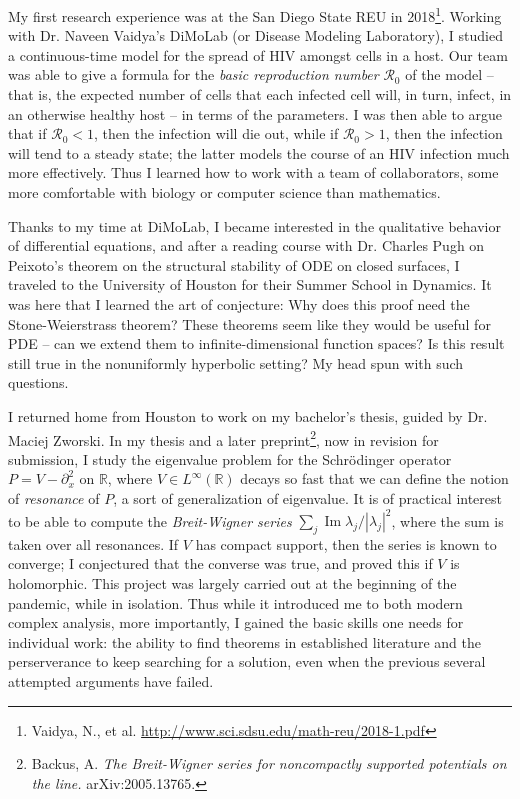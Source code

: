 \documentclass[12pt]{article}
\begin{document}
My first research experience was at the San Diego State REU in 2018\footnote{Vaidya, N., et al. \url{http://www.sci.sdsu.edu/math-reu/2018-1.pdf}}.
Working with Dr. Naveen Vaidya's DiMoLab (or Disease Modeling Laboratory), I studied a continuous-time model for the spread of HIV amongst cells in a host.
Our team was able to give a formula for the \emph{basic reproduction number} $\mathcal R_0$ of the model -- that is, the expected number of cells that each infected cell will, in turn, infect, in an otherwise healthy host -- in terms of the parameters.
I was then able to argue that if $\mathcal R_0 < 1$, then the infection will die out, while if $\mathcal R_0 > 1$, then the infection will tend to a steady state; the latter models the course of an HIV infection much more effectively.
Thus I learned how to work with a team of collaborators, some more comfortable with biology or computer science than mathematics.

Thanks to my time at DiMoLab, I became interested in the qualitative behavior of differential equations, and after a reading course with Dr. Charles Pugh on Peixoto's theorem on the structural stability of ODE on closed surfaces, I traveled to the University of Houston for their Summer School in Dynamics.
It was here that I learned the art of conjecture:
Why does this proof need the Stone-Weierstrass theorem?
These theorems seem like they would be useful for PDE -- can we extend them to infinite-dimensional function spaces?
Is this result still true in the nonuniformly hyperbolic setting?
My head spun with such questions.

I returned home from Houston to work on my bachelor's thesis, guided by Dr. Maciej Zworski.
In my thesis and a later preprint\footnote{Backus, A. \emph{The Breit-Wigner series for noncompactly supported potentials on the line.} arXiv:2005.13765.}, now in revision for submission, I study the eigenvalue problem for the Schr\"odinger operator $P = V - \partial_x^2$ on $\mathbb R$, where $V \in L^\infty(\mathbb R)$ decays so fast that we can define the notion of \emph{resonance} of $P$, a sort of generalization of eigenvalue.
It is of practical interest to be able to compute the \emph{Breit-Wigner series} $\sum_j \operatorname{Im} \lambda_j/|\lambda_j|^2$, where the sum is taken over all resonances.
If $V$ has compact support, then the series is known to converge; I conjectured that the converse was true, and proved this if $V$ is holomorphic.
This project was largely carried out at the beginning of the pandemic, while in isolation.
Thus while it introduced me to both modern complex analysis, more importantly, I gained the basic skills one needs for individual work: the ability to find theorems in established literature and the perserverance to keep searching for a solution, even when the previous several attempted arguments have failed.
\end{document}
